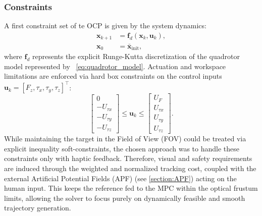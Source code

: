 \subsubsection{Constraints}
A first constraint set of te OCP is given by the system dynamics:
\begin{align}
    \mathbf{x}_{k+1} &= \mathbf{f}_d(\mathbf{x}_k, \mathbf{u}_k), \\
    \mathbf{x}_0 &= \bar{\mathbf{x}}_{\text{init}},
\end{align}
where $\mathbf{f}_d$ represents the explicit Runge-Kutta discretization of the quadrotor model represented by ~\ref{eq:quadrotor_model}. Actuation and workspace limitations are enforced via hard box constraints on the control inputs $\mathbf{u}_k = [F_z, \tau_x, \tau_y, \tau_z]^\top$:
\begin{equation}
    \begin{bmatrix} 0 \\ -U_{\tau x} \\ -U_{\tau y} \\ -U_{\tau z} \end{bmatrix} \le 
    \mathbf{u}_k \le 
    \begin{bmatrix} U_F \\ U_{\tau x} \\ U_{\tau y} \\ U_{\tau z} \end{bmatrix}.
\end{equation}
While maintaining the target in the Field of View (FOV) could be treated via explicit inequality soft-constraints, the chosen approach was to handle these constraints only with haptic feedback. Therefore, visual and safety requirements are induced through the weighted and normalized tracking cost, coupled with the external Artificial Potential Fields (APF) (see \ref{section:APF}) acting on the human input. This keeps the reference fed to the MPC within the optical frustum limits, allowing the solver to focus purely on dynamically feasible and smooth trajectory generation.
